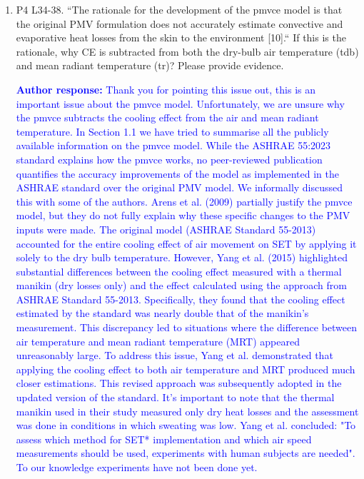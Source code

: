 \documentclass[a4paper, 10pt]{letter}
\newcommand{\response}[1]{\textcolor{blue}{\textbf{Author response:} #1}}
\begin{document}
\begin{letter}
\begin{enumerate}
            \item P4 L34-38.
            ``The rationale for the development of the \acs{pmvce} model is that the original PMV
            formulation does not accurately estimate convective and evaporative heat losses from
            the skin to the environment [10].`` If this is the rationale, why CE is subtracted from both
            the dry-bulb air temperature (tdb) and mean radiant temperature (tr)?
            Please provide evidence.

            \response{
                Thank you for pointing this issue out, this is an important issue about the \ac{pmvce} model.
                Unfortunately, we are unsure why the \ac{pmvce} subtracts the cooling effect from the air and mean radiant temperature. 
                In Section 1.1 we have tried to summarise all the publicly available information on the \ac{pmvce} model.
                While the ASHRAE 55:2023 standard explains how the \ac{pmvce} works, no peer-reviewed publication quantifies the accuracy improvements of the model as implemented in the ASHRAE standard over the original PMV model. 
                We informally discussed this with some of the authors.
                Arens et al. (2009) partially justify the \ac{pmvce} model, but they do not fully explain why these specific changes to the PMV inputs were made. 
                The original model (ASHRAE Standard 55-2013) accounted for the entire cooling effect of air movement on SET by applying it solely to the dry bulb temperature. 
                However, Yang et al. (2015) highlighted substantial differences between the cooling effect measured with a thermal manikin (dry losses only) and the effect calculated using the approach from ASHRAE Standard 55-2013. 
                Specifically, they found that the cooling effect estimated by the standard was nearly double that of the manikin’s measurement. 
                This discrepancy led to situations where the difference between air temperature and mean radiant temperature (MRT) appeared unreasonably large. 
                To address this issue, Yang et al. demonstrated that applying the cooling effect to both air temperature and MRT produced much closer estimations. 
                This revised approach was subsequently adopted in the updated version of the standard. 
                It’s important to note that the thermal manikin used in their study measured only dry heat losses and the assessment was done in conditions in which sweating was low. 
                Yang et al. concluded: "To assess which method for SET* implementation and which air speed measurements should be used, experiments with human subjects are needed". 
                To our knowledge experiments have not been done yet.  
            }


\end{enumerate}
\end{letter}
\end{document}
